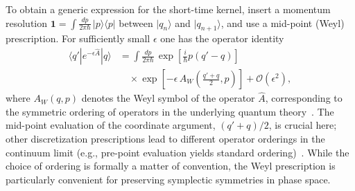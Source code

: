 To obtain a generic expression for the short-time kernel, insert a momentum resolution
$\mathbf 1=\int \frac{dp}{2\pi\hbar}\,|p\rangle\langle p|$ between $|q_n\rangle$ and
$|q_{n+1}\rangle$, and use a mid-point (Weyl) prescription. For sufficiently small
$\epsilon$ one has the operator identity
\begin{equation}
\begin{split}
    \langle q'|e^{-\epsilon \hat A}|q\rangle
    &=
    \int\frac{dp}{2\pi\hbar}\,
    \exp\!\left[\frac{i}{\hbar}p(q'-q)\right]
    \\
    &\quad\times
    \exp\!\left[-\epsilon\,A_W\!\left(\frac{q'+q}{2},p\right)\right]
    +\mathcal O(\epsilon^2),
\end{split}
    \label{eq:short_time_weyl}
\end{equation}
where $A_W(q,p)$ denotes the Weyl symbol of the operator $\hat A$, corresponding to the symmetric ordering of operators in the underlying quantum theory~\cite{schulmanTechniquesApplicationsPath1981, berezinMethodSecondQuantization1966}. The mid-point evaluation of the coordinate argument, $(q'+q)/2$, is crucial here; other discretization prescriptions lead to different operator orderings in the continuum limit (e.g., pre-point evaluation yields standard ordering)~\cite{groscheHandbookFeynmanPath1998, kleinertPathIntegralsQuantum2009}. While the choice of ordering is formally a matter of convention, the Weyl prescription is particularly convenient for preserving symplectic symmetries in phase space.

